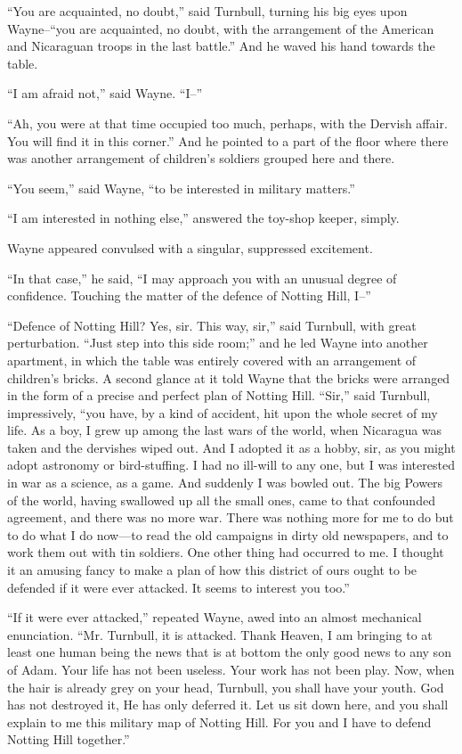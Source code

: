 \documentclass{book}
\begin{document}
“You are acquainted, no doubt,” said Turnbull, turning his big eyes upon Wayne–“you are acquainted, no doubt, with the arrangement of the American and Nicaraguan troops in the last battle.” And he waved his hand towards the table.

“I am afraid not,” said Wayne. “I–”

“Ah, you were at that time occupied too much, perhaps, with the Dervish affair. You will find it in this corner.” And he pointed to a part of the floor where there was another arrangement of children’s soldiers grouped here and there.

“You seem,” said Wayne, “to be interested in military matters.”

“I am interested in nothing else,” answered the toy-shop keeper, simply.

Wayne appeared convulsed with a singular, suppressed excitement.

“In that case,” he said, “I may approach you with an unusual degree of confidence. Touching the matter of the defence of Notting Hill, I–”

“Defence of Notting Hill? Yes, sir. This way, sir,” said Turnbull, with great perturbation. “Just step into this side room;” and he led Wayne into another apartment, in which the table was entirely covered with an arrangement of children’s bricks. A second glance at it told Wayne that the bricks were arranged in the form of a precise and perfect plan of Notting Hill. “Sir,” said Turnbull, impressively, “you have, by a kind of accident, hit upon the whole secret of my life. As a boy, I grew up among the last wars of the world, when Nicaragua was taken and the dervishes wiped out. And I adopted it as a hobby, sir, as you might adopt astronomy or bird-stuffing. I had no ill-will to any one, but I was interested in war as a science, as a game. And suddenly I was bowled out. The big Powers of the world, having swallowed up all the small ones, came to that confounded agreement, and there was no more war. There was nothing more for me to do but to do what I do now—to read the old campaigns in dirty old newspapers, and to work them out with tin soldiers. One other thing had occurred to me. I thought it an amusing fancy to make a plan of how this district of ours ought to be defended if it were ever attacked. It seems to interest you too.”

“If it were ever attacked,” repeated Wayne, awed into an almost mechanical enunciation. “Mr. Turnbull, it is attacked. Thank Heaven, I am bringing to at least one human being the news that is at bottom the only good news to any son of Adam. Your life has not been useless. Your work has not been play. Now, when the hair is already grey on your head, Turnbull, you shall have your youth. God has not destroyed it, He has only deferred it. Let us sit down here, and you shall explain to me this military map of Notting Hill. For you and I have to defend Notting Hill together.”
\end{document}
